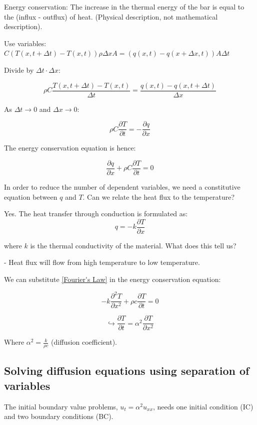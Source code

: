Energy conservation: The increase in the thermal energy of the bar is equal to the (influx - outflux) of heat.  (Physical description, not mathematical description). 

Use variables: $C (T(x,t + \Delta t) - T(x,t)) \rho \Delta x A = (q (x,t) - q(x + \Delta x, t)) A \Delta t$

Divide by $\Delta t \cdot \Delta x$: 

$$\rho C \frac{T(x,t + \Delta t) - T(x,t)}{\Delta t} = \frac{q(x,t) - q(x,t + \Delta t)}{\Delta x}$$

As $\Delta t \to 0$ and $\Delta x \to 0$:

$$\rho C \frac{\partial T}{\partial t} = - \frac{\partial q}{\partial x}$$

The energy conservation equation is hence:

\begin{equation}
\label{energy conservation equation}
    \frac{\partial q}{\partial x} + \rho C \frac{\partial T}{\partial t} = 0
\end{equation}

In order to reduce the number of dependent variables, we need a constitutive equation between $q$ and $T$. Can we relate the heat flux to the temperature?

Yes. The heat transfer through conduction is formulated as:
\begin{equation}
\label{Fourier's Law}
\tag{Fourier's Law}
    q = -k \frac{\partial T}{\partial x}
\end{equation}

where $k$ is the thermal conductivity of the material. What does this tell us?

- Heat flux will flow from high temperature to low temperature. 

We can substitute \ref{Fourier's Law} in the energy conservation equation:

$$-k \frac{\partial^2 T}{\partial x^2} + \rho c \frac{\partial T}{\partial t} = 0$$

$$\hookrightarrow \frac{\partial T}{\partial t} = \alpha^2 \frac{\partial T}{\partial x^2}$$

Where $\alpha^2 = \frac{k}{\rho c}$ (diffusion coefficient). 

\subsection{Solving diffusion equations using separation of variables}

The initial boundary value problems, $u_t = \alpha^2 u_{xx}$, needs one initial condition (IC) and two boundary conditions (BC). 

